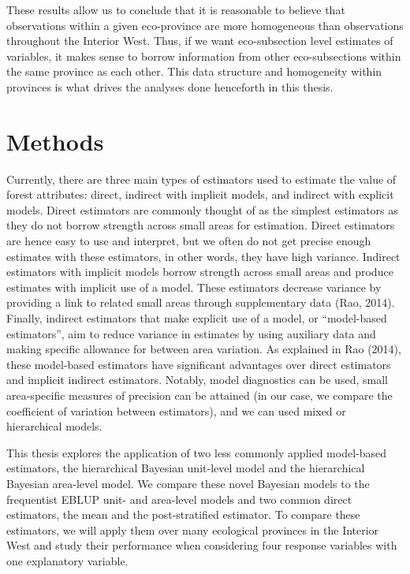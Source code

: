\documentclass[12pt,twoside]{reedthesis}
\begin{document}
These results allow us to conclude that it is reasonable to believe that observations within a given eco-province are more homogeneous than observations throughout the Interior West. Thus, if we want eco-subsection level estimates of variables, it makes sense to borrow information from other eco-subsections within the same province as each other. This data structure and homogeneity within provinces is what drives the analyses done henceforth in this thesis.

\hypertarget{methods}{%
\chapter{Methods}\label{methods}}

Currently, there are three main types of estimators used to estimate the value of forest attributes: direct, indirect with implicit models, and indirect with explicit models. Direct estimators are commonly thought of as the simplest estimators as they do not borrow strength across small areas for estimation. Direct estimators are hence easy to use and interpret, but we often do not get precise enough estimates with these estimators, in other words, they have high variance. Indirect estimators with implicit models borrow strength across small areas and produce estimates with implicit use of a model. These estimators decrease variance by providing a link to related small areas through supplementary data (Rao, 2014). Finally, indirect estimators that make explicit use of a model, or ``model-based estimators'', aim to reduce variance in estimates by using auxiliary data and making specific allowance for between area variation. As explained in Rao (2014), these model-based estimators have significant advantages over direct estimators and implicit indirect estimators. Notably, model diagnostics can be used, small area-specific measures of precision can be attained (in our case, we compare the coefficient of variation between estimators), and we can used mixed or hierarchical models.

This thesis explores the application of two less commonly applied model-based estimators, the hierarchical Bayesian unit-level model and the hierarchical Bayesian area-level model. We compare these novel Bayesian models to the frequentist EBLUP unit- and area-level models and two common direct estimators, the mean and the post-stratified estimator. To compare these estimators, we will apply them over many ecological provinces in the Interior West and study their performance when considering four response variables with one explanatory variable.
\end{document}
